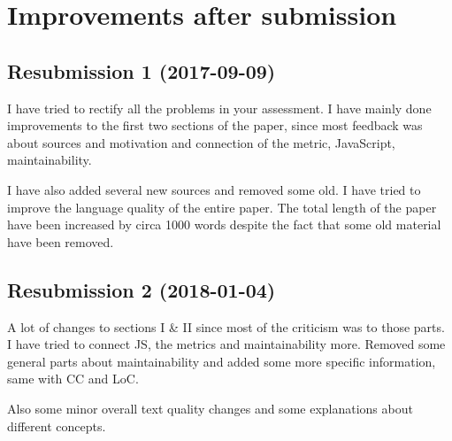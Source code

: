 \documentclass[conference, a4paper]{IEEEtran}
\begin{document}

\section*{Improvements after submission}
\subsection{Resubmission 1 (2017-09-09)}
I have tried to rectify all the problems in your assessment. I have mainly done improvements to the first two sections of the paper, since most feedback was about sources and motivation and connection of the metric, JavaScript, maintainability.

I have also added several new sources and removed some old. I have tried to improve the language quality of the entire paper. The total length of the paper have been increased by circa 1000 words despite the fact that some old material have been removed.
\subsection{Resubmission 2 (2018-01-04)}

A lot of changes to sections I \& II since most of the criticism was to those parts. I have tried to connect JS, the metrics and maintainability more. Removed some general parts about maintainability and added some more specific information, same with CC and LoC.

Also some minor overall text quality changes and some explanations about different concepts.
\end{document}

